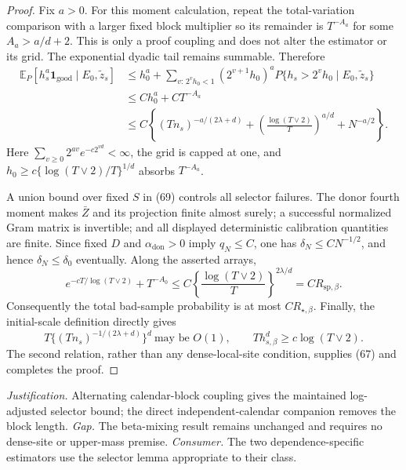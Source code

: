 \documentclass{article}
\begin{document}
\begin{proof}
Fix \(a>0\).  For this moment calculation, repeat the total-variation comparison with a larger fixed block multiplier so its remainder is \(T^{-A_a}\) for some \(A_a>a/d+2\).  This is only a proof coupling and does not alter the estimator or its grid.  The exponential dyadic tail remains summable.  Therefore
\[
\begin{aligned}
\mathbb E_P[h_s^a\mathbf1_{\mathrm{good}}\mid E_0,\widetilde z_s]
&\leq h_0^a+
\sum_{v:\,2^vh_0<1}(2^{v+1}h_0)^a
P\{h_s>2^vh_0\mid E_0,\widetilde z_s\}\\
&\leq Ch_0^a+CT^{-A_a}\\
&\leq C\left\{(Tn_s)^{-a/(2\lambda+d)}
+\left(\frac{\log(T\vee2)}T\right)^{a/d}
+N^{-a/2}\right\}.
\end{aligned}
\tag{70}
\]
Here \(\sum_{v\geq0}2^{av}e^{-c2^{vd}}<\infty\), the grid is capped at one, and \(h_0\geq c\{\log(T\vee2)/T\}^{1/d}\) absorbs \(T^{-A_a}\).

A union bound over fixed \(S\) in (69) controls all selector failures.  The donor fourth moment makes \(\bar Z\) and its projection finite almost surely; a successful normalized Gram matrix is invertible; and all displayed deterministic calibration quantities are finite.  Since fixed \(D\) and \(\alpha_{\mathrm{don}}>0\) imply \(q_N\leq C\), one has \(\delta_N\leq CN^{-1/2}\), and hence \(\delta_N\leq\delta_0\) eventually.  Along the asserted arrays,
\[
e^{-cT/\log(T\vee2)}+T^{-A_0}
\leq C\left\{\frac{\log(T\vee2)}T\right\}^{2\lambda/d}
=CR_{\mathrm{sp},\beta}.
\tag{71}
\]
Consequently the total bad-sample probability is at most \(CR_{\star,\beta}\).  Finally, the initial-scale definition directly gives
\[
T\{(Tn_s)^{-1/(2\lambda+d)}\}^d\ \text{may be }O(1),
\qquad
Th_{s,\beta}^d\geq c\log(T\vee2).
\tag{72}
\]
The second relation, rather than any dense-local-site condition, supplies (67) and completes the proof.
\end{proof}
\par\smallskip\noindent \textit{Justification.} Alternating calendar-block coupling gives the maintained log-adjusted selector bound; the direct independent-calendar companion removes the block length. \textit{Gap.} The beta-mixing result remains unchanged and requires no dense-site or upper-mass premise. \textit{Consumer.} The two dependence-specific estimators use the selector lemma appropriate to their class.
\end{document}
